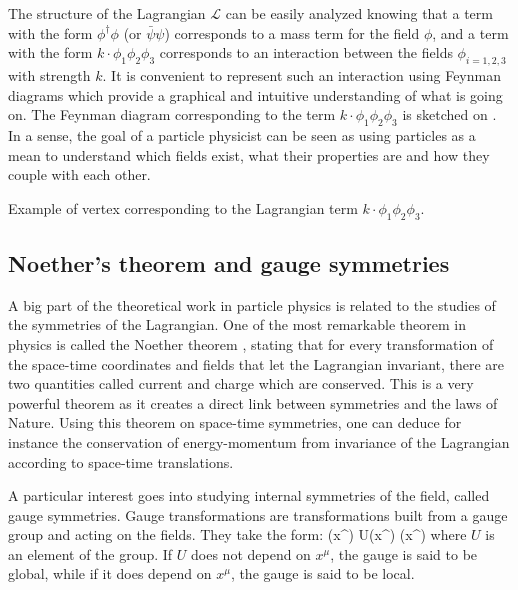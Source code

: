     The structure of the Lagrangian $\mathcal{L}$ can be easily analyzed knowing
    that a term with the form $\phi^\dagger \phi$ (or $\bar{\psi}\psi$)
    corresponds to a mass term for the field $\phi$, and a term with the form $k
    \cdot \phi_1 \phi_2 \phi_3$ corresponds to an interaction between the fields
    $\phi_{i=1,2,3}$ with strength $k$. It is convenient to represent such an
    interaction using Feynman diagrams which provide a graphical and intuitive
    understanding of what is going on. The Feynman diagram corresponding to the
    term  $k \cdot \phi_1 \phi_2 \phi_3$ is sketched on
    .  In a sense, the goal of a particle
    physicist can be seen as using particles as a mean to understand which
    fields exist, what their properties are and how they couple with each other.

                 {Example of vertex corresponding to the Lagrangian term
                 $k \cdot \phi_1 \phi_2 \phi_3$.}

        \subsection{Noether's theorem and gauge symmetries}

    A big part of the theoretical work in particle physics is related to the
    studies of the symmetries of the Lagrangian. One of the most remarkable
    theorem in physics is called the Noether theorem \cite{Noether}, stating
    that for every transformation of the space-time coordinates and fields that
    let the Lagrangian invariant, there are two quantities called current and
    charge which are conserved. This is a very powerful theorem as it creates a
    direct link between symmetries and the laws of Nature. Using this theorem on
    space-time symmetries, one can deduce for instance the conservation of
    energy-momentum from invariance of the Lagrangian according to space-time
    translations.

    A particular interest goes into studying internal symmetries of the field,
    called gauge symmetries. Gauge transformations are transformations built
    from a gauge group and acting on the fields. They take the form:
    {
        \psi(x^\mu)
        \rightarrow
        U(x^\mu) \psi(x^\mu)
    }
    where $U$ is an element of the group. If $U$ does not depend on $x^\mu$, the
    gauge is said to be global, while if it does depend on $x^\mu$, the gauge is
    said to be local.

